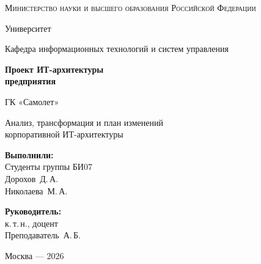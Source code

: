 \documentclass[12pt,a4paper]{article}
\begin{document}
\begin{titlepage}
\thispagestyle{empty}
\begin{center}

\vspace*{10mm}
{\large\textsc{Министерство науки и высшего образования Российской Федерации}}

\vspace{5mm}
{\large Университет}

\vspace{5mm}
{\normalsize Кафедра информационных технологий и систем управления}

\vspace{30mm}
{\Huge\bfseries\color{samoletblue} Проект ИТ-архитектуры\\[6pt] предприятия}

\vspace{10mm}
{\LARGE\color{samoletdark} ГК «Самолет»}

\vspace{8mm}
{\large Анализ, трансформация и план изменений\\
корпоративной ИТ-архитектуры}

\vspace{25mm}

\begin{minipage}{0.45\textwidth}
\begin{flushleft}
{\normalsize \textbf{Выполнили:}\\
Студенты группы БИ07\\[4pt]
Дорохов~Д.\,А.\\
Николаева~М.\,А.}
\end{flushleft}
\end{minipage}
\hfill
\begin{minipage}{0.45\textwidth}
\begin{flushright}
{\normalsize \textbf{Руководитель:}\\[4pt]
к.\,т.\,н., доцент\\
Преподаватель~А.\,Б.}
\end{flushright}
\end{minipage}

\vfill
{\large Москва --- 2026}

\end{center}
\end{titlepage}

\tableofcontents
\newpage
{}
\setcounter{page}{3}
\end{document}
